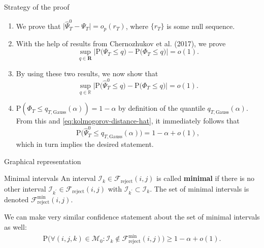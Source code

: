 \documentclass[10pt]{beamer}
\newcommand{\Prob}{\mathrm{P}}
\begin{document}
\begin{frame}{Strategy of the proof}
\begin{enumerate}
\item We prove that  $\big| \hat{\Psi}_T^0 - \Psi_T \big| = o_p(r_T)$, where $\{r_T\}$ is some null sequence.

\item With the help of results from Chernozhukov et al. (2017), we prove
\begin{equation*}\label{eq:kolmogorov-distance}
\sup_{q \in \mathbf{R}} \Big| \Prob\big( \Psi_T \le q \big) - \Prob\big( \Phi_T \le q \big) \Big| = o(1).
\end{equation*}
\item By using these two results, we now show that 
\begin{equation}\label{eq:kolmogorov-distance-hat}
\sup_{q \in \mathbb{R}} \Big| \Prob\big( \hat{\Psi}_T^0 \le q \big) - \Prob\big( \Phi_T \le q \big) \Big| = o(1).
\end{equation}
\item $\Prob (\Phi_T \le q_{T,\text{Gauss}}(\alpha)) = 1-\alpha$ by definition of the quantile $q_{T,\text{Gauss}}(\alpha)$. From this and \eqref{eq:kolmogorov-distance-hat}, it immediately follows that  
\begin{equation*}
\Prob\big( \hat{\Psi}_T^0 \le q_{T,\text{Gauss}}(\alpha) \big) = 1 - \alpha + o(1), 
\end{equation*}
which in turn implies the desired statement.
\end{enumerate}
\end{frame}

\begin{frame}{Graphical representation}
\begin{block}{Minimal intervals}
An interval $\mathcal{I}_k \in \mathcal{F}_{\text{reject}}(i, j)$ is called \textbf{minimal} if there is no other interval $\mathcal{I}_{k^\prime} \in \mathcal{F}_{\text{reject}}(i, j)$ with $\mathcal{I}_{k^\prime} \subset \mathcal{I}_k$. The set of minimal intervals is denoted $\mathcal{F}_{\text{reject}}^{\min} (i, j)$.
\end{block}\pause
We can make very similar confidence statement about the set of minimal intervals as well:
\begin{align*}
 \Prob\Big( \forall (i,j,k) \in \mathcal{M}_0: \mathcal{I}_k \notin \mathcal{F}_{\text{reject}}^{\min} (i, j) \Big) \ge 1 - \alpha + o(1).
\end{align*}
\end{frame}
\end{document}
